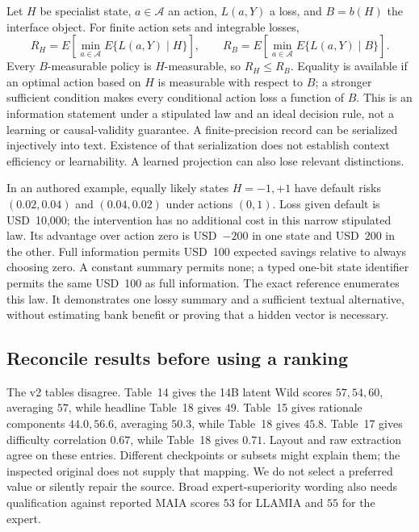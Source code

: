 Let $H$ be specialist state, $a\in\mathcal A$ an action, $L(a,Y)$ a loss, and $B=b(H)$ the interface object. For finite action sets and integrable losses,
\begin{equation}
 R_H=E\!\left[\min_{a\in\mathcal A}E\{L(a,Y)\mid H\}\right],\qquad
 R_B=E\!\left[\min_{a\in\mathcal A}E\{L(a,Y)\mid B\}\right].
 \label{eq:exec24-collaboration-sufficiency}
\end{equation}
Every $B$-measurable policy is $H$-measurable, so $R_H\leq R_B$. Equality is available if an optimal action based on $H$ is measurable with respect to $B$; a stronger sufficient condition makes every conditional action loss a function of $B$. This is an information statement under a stipulated law and an ideal decision rule, not a learning or causal-validity guarantee. A finite-precision record can be serialized injectively into text. Existence of that serialization does not establish context efficiency or learnability. A learned projection can also lose relevant distinctions.~\citep{exec24_collaboration_reference}

In an authored example, equally likely states $H=-1,+1$ have default risks $(0.02,0.04)$ and $(0.04,0.02)$ under actions $(0,1)$. Loss given default is USD~10,000; the intervention has no additional cost in this narrow stipulated law. Its advantage over action zero is USD~$-200$ in one state and USD~$200$ in the other. Full information permits USD~100 expected savings relative to always choosing zero. A constant summary permits none; a typed one-bit state identifier permits the same USD~100 as full information. The exact reference enumerates this law. It demonstrates one lossy summary and a sufficient textual alternative, without estimating bank benefit or proving that a hidden vector is necessary.~\citep{exec24_collaboration_reference}

\subsection{Reconcile results before using a ranking}
The v2 tables disagree. Table~14 gives the 14B latent Wild scores $57,54,60$, averaging $57$, while headline Table~18 gives $49$. Table~15 gives rationale components $44.0,56.6$, averaging $50.3$, while Table~18 gives $45.8$. Table~17 gives difficulty correlation $0.67$, while Table~18 gives $0.71$. Layout and raw extraction agree on these entries. Different checkpoints or subsets might explain them; the inspected original does not supply that mapping. We do not select a preferred value or silently repair the source. Broad expert-superiority wording also needs qualification against reported MAIA scores $53$ for LLAMIA and $55$ for the expert.~\citep{exec24_collaboration_original,exec24_collaboration_reference}

